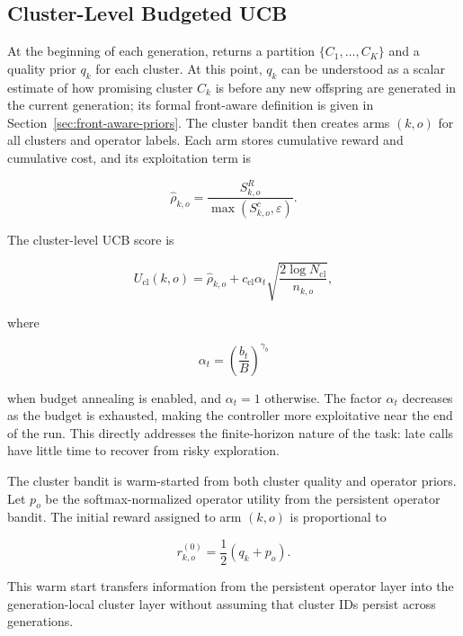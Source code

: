 \subsection{Cluster-Level Budgeted UCB}

At the beginning of each generation,  returns a partition $\{C_1,\ldots,C_K\}$ and a quality prior $q_k$ for each cluster. At this point, $q_k$ can be understood as a scalar estimate of how promising cluster $C_k$ is before any new offspring are generated in the current generation; its formal front-aware definition is given in Section~\ref{sec:front-aware-priors}. The cluster bandit then creates arms $(k,o)$ for all clusters and operator labels. Each arm stores cumulative reward and cumulative cost, and its exploitation term is

\begin{equation}
  \hat{\rho}_{k,o}
  =
  \frac{S_{k,o}^R}{\max(S_{k,o}^c,\varepsilon)}.
\end{equation}

The cluster-level UCB score is

\begin{equation}
  U_{\mathrm{cl}}(k,o)
  =
  \hat{\rho}_{k,o}
  +
  c_{\mathrm{cl}}
  \alpha_t
  \sqrt{\frac{2\log N_{\mathrm{cl}}}{n_{k,o}}},
  \label{eq:cluster-ucb}
\end{equation}

where

\begin{equation}
  \alpha_t =
  \left(\frac{b_t}{B}\right)^{\gamma_b}
\end{equation}

when budget annealing is enabled, and $\alpha_t=1$ otherwise. The factor $\alpha_t$ decreases as the budget is exhausted, making the controller more exploitative near the end of the run. This directly addresses the finite-horizon nature of the task: late calls have little time to recover from risky exploration.

The cluster bandit is warm-started from both cluster quality and operator priors. Let $p_o$ be the softmax-normalized operator utility from the persistent operator bandit. The initial reward assigned to arm $(k,o)$ is proportional to

\begin{equation}
  r^{(0)}_{k,o} = \frac{1}{2}\left(q_k+p_o\right).
\end{equation}

This warm start transfers information from the persistent operator layer into the generation-local cluster layer without assuming that cluster IDs persist across generations.

